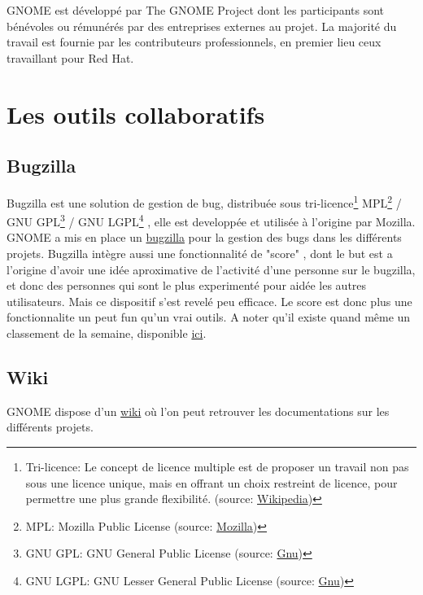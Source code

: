 \documentclass[12pt]{report}
\begin{document}
GNOME est développé par The GNOME Project dont les participants sont
bénévoles ou rémunérés par des entreprises externes au projet. La
majorité du travail est fournie par les contributeurs professionnels,
en premier lieu ceux travaillant pour Red Hat.

\section{Les outils collaboratifs} 
\subsection{Bugzilla}
\label{bugzilla}
Bugzilla est une solution de gestion de bug, distribuée sous
tri-licence\footnote{Tri-licence: Le concept de licence multiple
  est de proposer un travail non pas sous une licence unique, mais
  en offrant un choix restreint de licence, pour permettre une plus
  grande flexibilité. (source:
  \href{https://fr.wikipedia.org/wiki/Licence_multiple}{Wikipedia})}
MPL\footnote{MPL: Mozilla Public License (source:
  \href{https://www.mozilla.org/en-US/MPL/}{Mozilla})}
/ GNU GPL\footnote{GNU GPL: GNU General Public License (source:
  \href{https://www.gnu.org/licenses/gpl.html}{Gnu})}
/ GNU LGPL\footnote{GNU LGPL: GNU Lesser General Public License (source:
  \href{https://www.gnu.org/licenses/lgpl.html}{Gnu})}
, elle est developpée et utilisée à l'origine par Mozilla.
GNOME a mis en place un \href{https://bugzilla.gnome.org}{bugzilla} pour 
la gestion des bugs dans les différents projets.
\newline
Bugzilla intègre aussi une fonctionnalité de "score"
, dont le but est a l'origine d'avoir une idée 
aproximative de l'activité d'une personne  sur le bugzilla, et donc 
des personnes qui sont le plus experimenté pour aidée les autres 
utilisateurs. Mais ce dispositif s'est revelé peu efficace. Le
score est donc plus une fonctionnalite un peut fun qu'un vrai outils.
A noter qu'il existe quand même un classement de la semaine, disponible 
\href{https://bugzilla.gnome.org/page.cgi?id=weekly-bug-summary.html}{ici}.

\subsection{Wiki}
\label{wiki}
GNOME dispose d'un \href{https://wiki.gnome.org/}{wiki} où l'on peut retrouver 
les documentations sur les différents projets.
\end{document}
